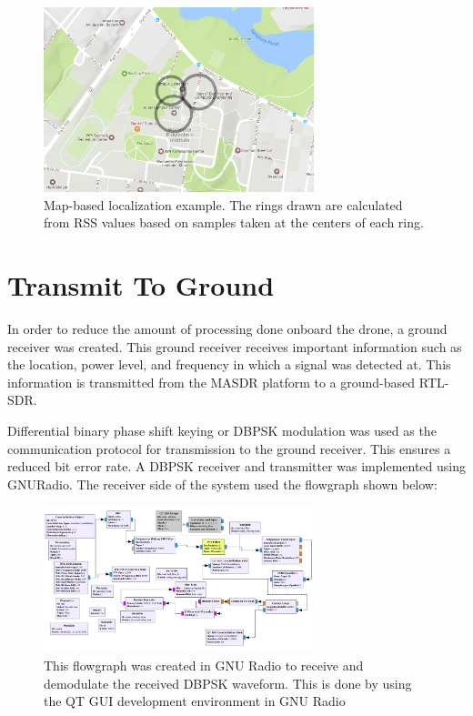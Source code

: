 \begin{figure}[ht]
\centering
\includegraphics[width=0.70\textwidth]{img/localization_map_visualization.png}
\caption{Map-based localization example. The rings drawn are calculated from RSS values based on samples taken at the centers of each ring.}
\label{fig:map_localize}
\end{figure}

\section{Transmit To Ground}

In order to reduce the amount of processing done onboard the drone, a ground receiver was created.  This ground receiver receives important information such as the location, power level, and frequency in which a signal was detected at.  This information is transmitted from the MASDR platform to a ground-based RTL-SDR.  

Differential binary phase shift keying or DBPSK modulation was used as the communication protocol for transmission to the ground receiver. This ensures a reduced bit error rate. A DBPSK receiver and transmitter was implemented using GNURadio. The receiver side of the system used the flowgraph shown below:

\begin{figure}[h]
  \centering
  \includegraphics[width=0.70\textwidth]{img/rxflow.PNG}
  \caption{This flowgraph was created in GNU Radio to receive and demodulate the received DBPSK waveform. This is done by using the QT GUI development environment in GNU Radio}
  \label{fig:rxflow}
\end{figure}

